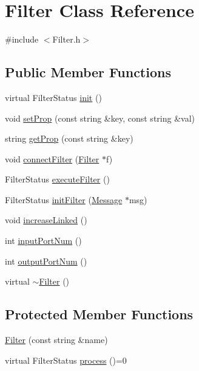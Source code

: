 \hypertarget{classFilter}{\section{Filter Class Reference}
\label{classFilter}
}


{\ttfamily \#include $<$Filter.\-h$>$}

\subsection*{Public Member Functions}
\begin{DoxyCompactItemize}
\item 
virtual Filter\-Status \hyperlink{classFilter_a16bc703e6da3656e8c86304bdda0c87e}{init} ()
\item 
void \hyperlink{classFilter_ae089d87624ac09bedb2f14c828883059}{set\-Prop} (const string \&key, const string \&val)
\item 
string \hyperlink{classFilter_a18ef0744ac52a3eacf40f3f51b94ebff}{get\-Prop} (const string \&key)
\item 
void \hyperlink{classFilter_aa5dcdeb22491c1888e66005fdec40c67}{connect\-Filter} (\hyperlink{classFilter}{Filter} $\ast$f)
\item 
Filter\-Status \hyperlink{classFilter_a4a64945919a215c51f4fb91a30c07019}{execute\-Filter} ()
\item 
Filter\-Status \hyperlink{classFilter_aa7227c3c2da4751e5bd2da7a06488a2e}{init\-Filter} (\hyperlink{classMessage}{Message} $\ast$msg)
\item 
void \hyperlink{classFilter_af03e918aa936ad6db1fe073a4c0f7936}{increase\-Linked} ()
\item 
int \hyperlink{classFilter_adc71a72a2a0547864ecfb22d5c25a296}{input\-Port\-Num} ()
\item 
int \hyperlink{classFilter_a73560f4a4872c4598f5b6842c278b34b}{output\-Port\-Num} ()
\item 
virtual \hyperlink{classFilter_a502ee334d42eac3edbaf32b599f9c35e}{$\sim$\-Filter} ()
\end{DoxyCompactItemize}
\subsection*{Protected Member Functions}
\begin{DoxyCompactItemize}
\item 
\hyperlink{classFilter_a7ae8f58626026a84e7eabde716776ec1}{Filter} (const string \&name)
\item 
virtual Filter\-Status \hyperlink{classFilter_afc96de71a53a15012de467491cf4e295}{process} ()=0
\end{DoxyCompactItemize}
